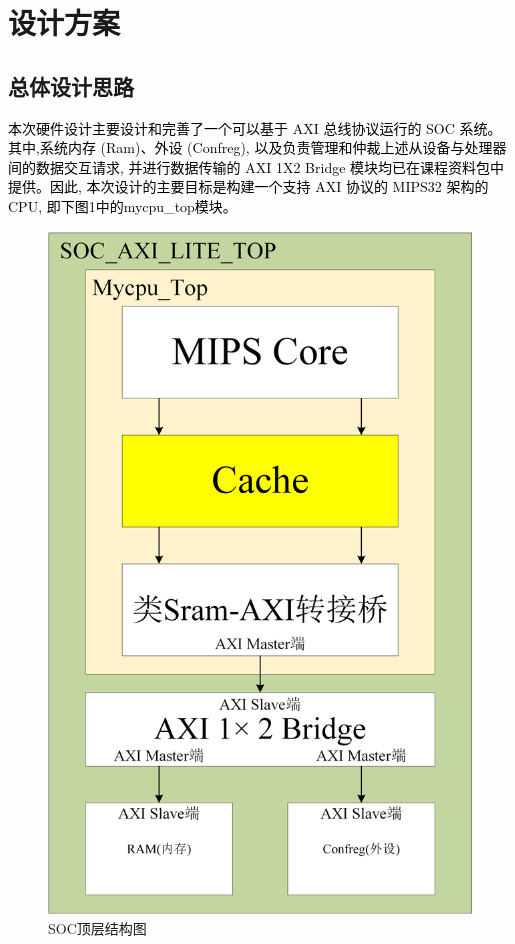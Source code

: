 \section{设计方案}
\subsection{总体设计思路}
\textcolor{black}{本次硬件设计主要设计和完善了一个可以基于 AXI 总线协议运行的 SOC 系统。其中,系统内存 (Ram)、外设 (Confreg), 以及负责管理和仲裁上述从设备与处理器间的数据交互请求, 并进行数据传输的 AXI 1X2 Bridge 模块均已在课程资料包中提供。因此, 本次设计的主要目标是构建一个支持 AXI 协议的 MIPS32 架构的 CPU, 即下图1中的mycpu\_top模块。}
\begin{figure}[h]
	\centering
	\includegraphics[width=0.25\linewidth]{image/p14.png}
	\caption{SOC顶层结构图}
	\label{fig:enter-label}
\end{figure}

